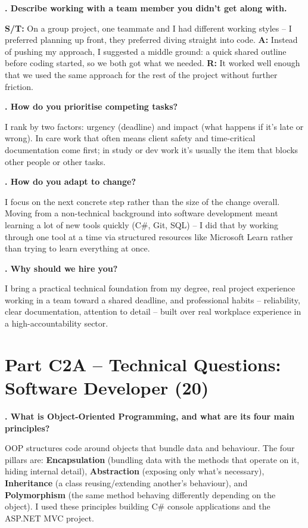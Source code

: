 \documentclass[10.5pt]{article}
\newcounter{qnum}
\newcommand{\resetq}{\setcounter{qnum}{0}}
\newcommand{\qa}[2]{%
  \stepcounter{qnum}%
  \textbf{\theqnum. #1}\par
  #2\par
  \vspace{6pt}
}
\begin{document}
\qa{Describe working with a team member you didn't get along with.}{\textbf{S/T:} On a group project, one teammate and I had different working styles -- I preferred planning up front, they preferred diving straight into code. \textbf{A:} Instead of pushing my approach, I suggested a middle ground: a quick shared outline before coding started, so we both got what we needed. \textbf{R:} It worked well enough that we used the same approach for the rest of the project without further friction.}

\qa{How do you prioritise competing tasks?}{I rank by two factors: urgency (deadline) and impact (what happens if it's late or wrong). In care work that often means client safety and time-critical documentation come first; in study or dev work it's usually the item that blocks other people or other tasks.}

\qa{How do you adapt to change?}{I focus on the next concrete step rather than the size of the change overall. Moving from a non-technical background into software development meant learning a lot of new tools quickly (C\#, Git, SQL) -- I did that by working through one tool at a time via structured resources like Microsoft Learn rather than trying to learn everything at once.}

\qa{Why should we hire you?}{I bring a practical technical foundation from my degree, real project experience working in a team toward a shared deadline, and professional habits -- reliability, clear documentation, attention to detail -- built over real workplace experience in a high-accountability sector.}

\newpage
\section{Part C2A -- Technical Questions: Software Developer (20)}
\resetq

\qa{What is Object-Oriented Programming, and what are its four main principles?}{OOP structures code around objects that bundle data and behaviour. The four pillars are: \textbf{Encapsulation} (bundling data with the methods that operate on it, hiding internal detail), \textbf{Abstraction} (exposing only what's necessary), \textbf{Inheritance} (a class reusing/extending another's behaviour), and \textbf{Polymorphism} (the same method behaving differently depending on the object). I used these principles building C\# console applications and the ASP.NET MVC project.}
\end{document}
